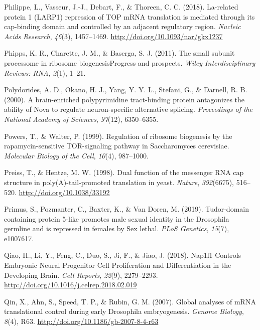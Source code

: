 \documentclass[12pt,twoside]{reedthesis}
\newlength{\cslhangindent}
\newenvironment{cslreferences}%
  {\setlength{\parindent}{0pt}%
  \everypar{\setlength{\hangindent}{\cslhangindent}}\ignorespaces}%
  {\par}
\begin{document}
\begin{cslreferences}
\leavevmode\hypertarget{ref-philippeLarelatedProteinLARP12018}{}%
Philippe, L., Vasseur, J.-J., Debart, F., \& Thoreen, C. C. (2018). La-related protein 1 (LARP1) repression of TOP mRNA translation is mediated through its cap-binding domain and controlled by an adjacent regulatory region. \emph{Nucleic Acids Research}, \emph{46}(3), 1457--1469. \url{http://doi.org/10.1093/nar/gkx1237}

\leavevmode\hypertarget{ref-Phipps2011a}{}%
Phipps, K. R., Charette, J. M., \& Baserga, S. J. (2011). The small subunit processome in ribosome biogenesisProgress and prospects. \emph{Wiley Interdisciplinary Reviews: RNA}, \emph{2}(1), 1--21.

\leavevmode\hypertarget{ref-Polydorides2000}{}%
Polydorides, A. D., Okano, H. J., Yang, Y. Y. L., Stefani, G., \& Darnell, R. B. (2000). A brain-enriched polypyrimidine tract-binding protein antagonizes the ability of Nova to regulate neuron-specific alternative splicing. \emph{Proceedings of the National Academy of Sciences}, \emph{97}(12), 6350--6355.

\leavevmode\hypertarget{ref-powersRegulationRibosomeBiogenesis1999}{}%
Powers, T., \& Walter, P. (1999). Regulation of ribosome biogenesis by the rapamycin-sensitive TOR-signaling pathway in Saccharomyces cerevisiae. \emph{Molecular Biology of the Cell}, \emph{10}(4), 987--1000.

\leavevmode\hypertarget{ref-Preiss1998g}{}%
Preiss, T., \& Hentze, M. W. (1998). Dual function of the messenger RNA cap structure in poly(A)-tail-promoted translation in yeast. \emph{Nature}, \emph{392}(6675), 516--520. \url{http://doi.org/10.1038/33192}

\leavevmode\hypertarget{ref-Primus2019}{}%
Primus, S., Pozmanter, C., Baxter, K., \& Van Doren, M. (2019). Tudor-domain containing protein 5-like promotes male sexual identity in the Drosophila germline and is repressed in females by Sex lethal. \emph{PLoS Genetics}, \emph{15}(7), e1007617.

\leavevmode\hypertarget{ref-qiaoNap1l1ControlsEmbryonic2018}{}%
Qiao, H., Li, Y., Feng, C., Duo, S., Ji, F., \& Jiao, J. (2018). Nap1l1 Controls Embryonic Neural Progenitor Cell Proliferation and Differentiation in the Developing Brain. \emph{Cell Reports}, \emph{22}(9), 2279--2293. \url{http://doi.org/10.1016/j.celrep.2018.02.019}

\leavevmode\hypertarget{ref-qinGlobalAnalysesMRNA2007a}{}%
Qin, X., Ahn, S., Speed, T. P., \& Rubin, G. M. (2007). Global analyses of mRNA translational control during early Drosophila embryogenesis. \emph{Genome Biology}, \emph{8}(4), R63. \url{http://doi.org/10.1186/gb-2007-8-4-r63}


\end{cslreferences}
\end{document}
